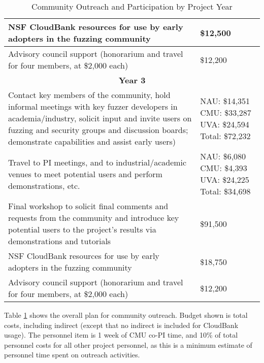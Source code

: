 \documentclass[12pt]{article}
\begin{document}
\begin{table}
\begin{tabular}{|p{12cm}|p{3cm}|}
    \hline
    NSF CloudBank resources for use by early adopters in the fuzzing 
    community & \$12,500 \\
    \hline 
    Advisory council support (honorarium and travel for four members, 
    at \$2,000 each) & \$12,200 \\    
    \hline
    \hline
    \multicolumn{2}{c}{{\bf Year 3}} \\
    \hline
    \hline
   Contact key members of the community, hold informal meetings with
    key fuzzer developers in academia/industry, solicit input and
    invite users
    on fuzzing and security groups and discussion boards; demonstrate
    capabilities and assist early users) &  NAU:  \$14,351 CMU: \$33,287 UVA: \$24,594
                                                      Total: \$72,232 \\
    \hline
    Travel to PI meetings, and to industrial/academic venues to meet
    potential users and perform demonstrations, etc. & NAU: \$6,080 CMU: \$4,393 UVA:  \$24,225 Total: \$34,698\\
    \hline    
    Final workshop to solicit final comments and requests from the
    community and introduce key potential users to the project’s
    results via demonstrations and tutorials & \$91,500 \\
    \hline
    NSF CloudBank resources for use by early adopters in the fuzzing 
    community & \$18,750 \\
    \hline 
    Advisory council support (honorarium and travel for four members, 
    at \$2,000 each) & \$12,200 \\    
    \hline    
 
  \end{tabular}
  \caption{Community Outreach and Participation by Project Year}
  \label{tab:outreach}
  
\end{table}


Table \ref{tab:outreach} shows the overall plan for community
outreach.   Budget shown is total costs, including indirect (except
that no indirect is included for CloudBank usage).   The personnel item is 1 week of CMU co-PI time, and 10\%
of total personnel costs for all other project personnel, as this is a
minimum estimate of personnel time spent on outreach activities.
\end{document}

